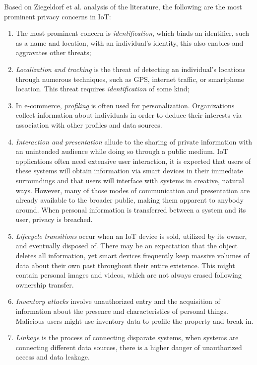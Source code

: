 Based on Ziegeldorf et al. \cite{ziegeldorf2014privacy} analysis of the literature,
the following are the most prominent privacy concerns in IoT:

\begin{enumerate}
    \item
    The most prominent concern is \textit{identification}, which binds an
    identifier, such as a name and location, with an individual's identity,
    this also enables and aggravates other threats;
    \item
    \textit{Localization and tracking} is the threat of detecting an individual's
    locations through numerous techniques, such as GPS, internet traffic,
    or smartphone location. This threat requires \textit{identification}
    of some kind;
    \item
    In e-commerce, \textit{profiling} is often used for personalization.
    Organizations collect information about individuals in order to deduce
    their interests via association with other profiles and data sources.
    \item
    \textit{Interaction and presentation} allude to the sharing of private
    information with an unintended audience while doing so through a public
    medium. IoT applications often need extensive user interaction, it is
    expected that users of these systems will obtain information via smart
    devices in their immediate surroundings and that users will interface
    with systems in creative, natural ways. However, many of those modes
    of communication and presentation are already available to the broader
    public, making them apparent to anybody around. When personal information
    is transferred between a system and its user, privacy is breached.
    \item
    \textit{Lifecycle transitions} occur when an IoT device is sold, utilized
    by its owner, and eventually disposed of. There may be an expectation
    that the object deletes all information, yet smart devices frequently
    keep massive volumes of data about their own past throughout their entire
    existence. This might contain personal images and videos, which are
    not always erased following ownership transfer.
    \item
    \textit{Inventory attacks} involve unauthorized entry and the acquisition
    of information about the presence and characteristics of personal things.
    Malicious users might use inventory data to profile the property and
    break in.
    \item
    \textit{Linkage} is the process of connecting disparate systems, when
    systems are connecting different data sources, there is a higher danger
    of unauthorized access and data leakage.
\end{enumerate}

